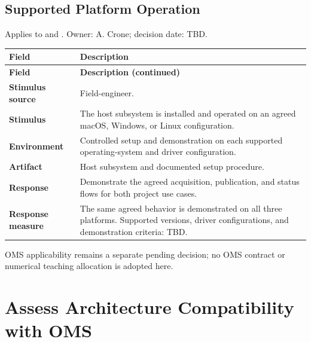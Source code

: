 \subsection{Supported Platform Operation}
Applies to  and . Owner: A. Crone; decision date: TBD.

\begin{tabularx}{\linewidth}{L{3.5cm}Y}
\caption{Supported Platform Operation\label{Table:SP800Quality5}}\\
\toprule
\textbf{Field} & \textbf{Description}\\\midrule\endfirsthead
\textbf{Field} & \textbf{Description (continued)}\\\midrule\endhead
\bottomrule\endlastfoot
\textbf{Stimulus source} & Field-engineer.\\
\textbf{Stimulus} & The host subsystem is installed and operated on an agreed macOS, Windows, or Linux configuration.\\
\textbf{Environment} & Controlled setup and demonstration on each supported operating-system and driver configuration.\\
\textbf{Artifact} & Host subsystem and documented setup procedure.\\
\textbf{Response} & Demonstrate the agreed acquisition, publication, and status flows for both project use cases.\\
\textbf{Response measure} & The same agreed behavior is demonstrated on all three platforms. Supported versions, driver configurations, and demonstration criteria: TBD.\\
\end{tabularx}

OMS applicability remains a separate pending decision; no OMS contract or numerical teaching allocation is adopted here.
\section{Assess Architecture Compatibility with OMS}

